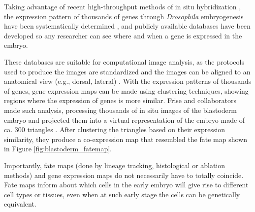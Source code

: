 Taking advantage of recent high-throughput methods of in situ hybridization \citep{Tomancak2002,Weiszmann2009}, the expression pattern of thousands of genes through \textit{Drosophila} embryogenesis have been systematically determined \citep{Tomancak2002,Tomancak2007,Hammonds2013}, and publicly available databases have been developed \citep{Tomancak2002,Kumar2011} so any researcher can see where and when a gene is expressed in the embryo.

These databases are suitable for computational image analysis, as the protocols used to produce the images are standardized \citep{Tomancak2002} and the images can be aligned to an anatomical view (e.g., dorsal, lateral) \citep{Kumar2011}.
With the expression patterns of thousands of genes, gene expression maps can be made using clustering techniques, showing regions where the expression of genes is more similar.
Frise and collaborators made such analysis, processing thousands of in situ images of the blastoderm embryo and projected them into a virtual representation of the embryo made of ca. 300 triangles \citep{Frise2010}. 
After clustering the triangles based on their expression similarity, they produce a co-expression map that resembled the fate map shown in Figure \ref{fig:blastoderm_fatemap}.

Importantly, fate maps (done by lineage tracking, histological or ablation methods) and gene expression maps do not necessarily have to totally coincide. Fate maps inform about which cells in the early embryo will give rise to different cell types or tissues, even when at such early stage the cells can be genetically equivalent.

